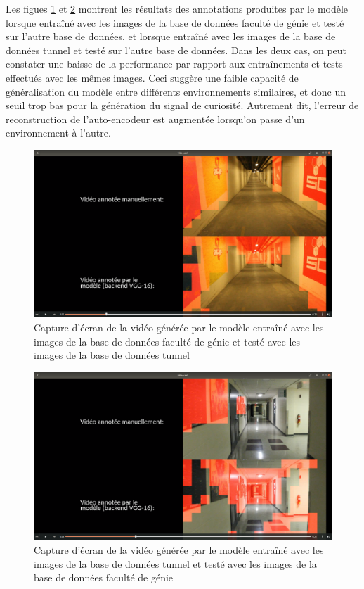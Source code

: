     Les figues \ref{fig:frame_tr_corridor_test_tunnel} et \ref{fig:frame_tr_tunnel_test_corridor} montrent les résultats des annotations produites par le modèle lorsque entraîné avec les images de la base de données faculté de génie et testé sur l'autre base de données, et lorsque entraîné avec les images de la base de données tunnel et testé sur l'autre base de données. Dans les deux cas, on peut constater une baisse de la performance par rapport aux entraînements et tests effectués avec les mêmes images. Ceci suggère une faible capacité de généralisation du modèle entre différents environnements similaires, et donc un seuil trop bas pour la génération du signal de curiosité. Autrement dit, l'erreur de reconstruction de l'auto-encodeur est augmentée lorsqu'on passe d'un environnement à l'autre.\\

    \begin{figure}
        \centering
        \includegraphics[width=17cm]{images/frame_tr_corridor_test_tunnel.png}
        \caption{Capture d'écran de la vidéo générée par le modèle entraîné avec les images de la base de données faculté de génie et testé avec les images de la base de données tunnel}
        \label{fig:frame_tr_corridor_test_tunnel}
    \end{figure}

    \begin{figure}
        \centering
        \includegraphics[width=17cm]{images/frame_tr_tunnel_test_corridor.png}
        \caption{Capture d'écran de la vidéo générée par le modèle entraîné avec les images de la base de données tunnel et testé avec les images de la base de données faculté de génie}
        \label{fig:frame_tr_tunnel_test_corridor}
    \end{figure}
    
